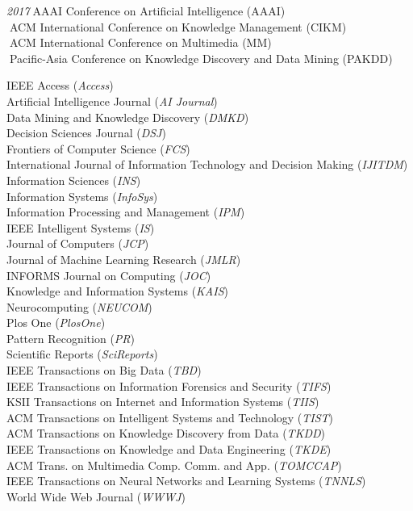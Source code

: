 \documentclass[10pt]{article}
\newenvironment{myindentpar}[1]%
{\begin{list}{}%
         {\setlength{\leftmargin}{#1}}%
         \item[]%
}
{\end{list}}
\newcounter{list}
\begin{document}
\begin{myindentpar}{0.75cm}
{\hspace{-0.75cm}\emph{2017}\textcolor{white}{.}AAAI Conference on Artificial Intelligence (AAAI) \\
\textcolor{white}{.}ACM International Conference on Knowledge Management (CIKM) \\
\textcolor{white}{.}ACM International Conference on Multimedia (MM) \\
\textcolor{white}{.}Pacific-Asia Conference on Knowledge Discovery and Data Mining (PAKDD)

}

\hspace{-0.75cm}{\bf Journal Reviewer}

{\small

IEEE Access (\textit{Access}) \\
Artificial Intelligence Journal (\textit{AI Journal}) \\
Data Mining and Knowledge Discovery (\textit{DMKD}) \\
Decision Sciences Journal (\textit{DSJ}) \\
Frontiers of Computer Science (\textit{FCS}) \\
International Journal of Information Technology and Decision Making (\textit{IJITDM}) \\
Information Sciences (\textit{INS}) \\
Information Systems (\textit{InfoSys}) \\
Information Processing and Management (\textit{IPM}) \\
IEEE Intelligent Systems (\textit{IS}) \\
Journal of Computers (\textit{JCP}) \\
Journal of Machine Learning Research (\textit{JMLR}) \\
INFORMS Journal on Computing (\textit{JOC}) \\
Knowledge and Information Systems (\textit{KAIS}) \\
Neurocomputing (\textit{NEUCOM}) \\
Plos One (\textit{PlosOne}) \\
Pattern Recognition (\textit{PR}) \\
Scientific Reports (\textit{SciReports}) \\
IEEE Transactions on Big Data (\textit{TBD}) \\
IEEE Transactions on Information Forensics and Security (\textit{TIFS}) \\
KSII Transactions on Internet and Information Systems (\textit{TIIS}) \\
ACM Transactions on Intelligent Systems and Technology (\textit{TIST}) \\
ACM Transactions on Knowledge Discovery from Data (\textit{TKDD}) \\
IEEE Transactions on Knowledge and Data Engineering (\textit{TKDE}) \\
ACM Trans. on Multimedia Comp. Comm. and App. (\textit{TOMCCAP}) \\
IEEE Transactions on Neural Networks and Learning Systems (\textit{TNNLS}) \\
World Wide Web Journal (\textit{WWWJ})

}


\end{myindentpar}
\end{document}

